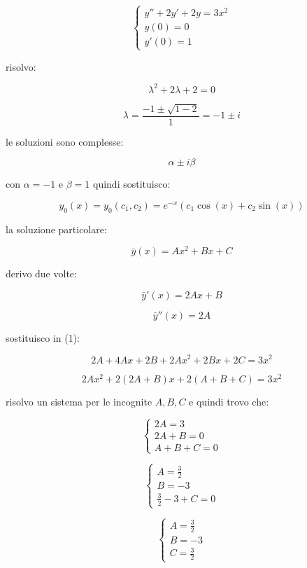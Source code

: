 \begin{equation*}
    \begin{cases*}
        y''+ 2y'+ 2y= 3x^{2} \\
        y(0) = 0             \\
        y'(0) = 1
    \end{cases*}
\end{equation*}


risolvo:

\[
    \lambda^{2}+2 \lambda+2 =0
\]

\[
    \lambda= \frac{-1 \pm \sqrt{1-2}}{1}= -1 \pm i
\]

le soluzioni sono complesse:

\[
    \alpha \pm  i \beta
\]

con \(\alpha = -1\) e \(\beta = 1\) quindi sostituisco:

\[
    y_0(x) = y_0(c_1,c_2) = e ^{-x}(c_1\cos(x) + c_2 \sin(x))
\]

la soluzione particolare:

\[
    \bar{y} (x) = A x^{2}+Bx+C
\]

derivo due volte:

\[
    \bar{y} '(x) = 2Ax + B
\]

\[
    \bar{y} ''(x) = 2A
\]

sostituisco in (1):

\[
    2A + 4Ax + 2B + 2Ax^{2}+2Bx + 2C = 3x^{2}
\]

\[
    2Ax^{2} + 2(2A+B) x + 2(A+B+C) = 3x^{2}
\]

risolvo un sistema per le incognite \(A,B,C\) e quindi trovo che:

\begin{equation*}
    \begin{cases*}
        2A = 3     \\
        2A + B = 0 \\
        A+B+C= 0
    \end{cases*}
\end{equation*}

\begin{equation*}
    \begin{cases*}
        A=\frac{3}{2} \\
        B=-3          \\
        \frac{3}{2}-3+C=0
    \end{cases*}
\end{equation*}

\begin{equation*}
    \begin{cases*}
        A=\frac{3}{2} \\
        B=-3          \\
        C=\frac{3}{2}
    \end{cases*}
\end{equation*}


